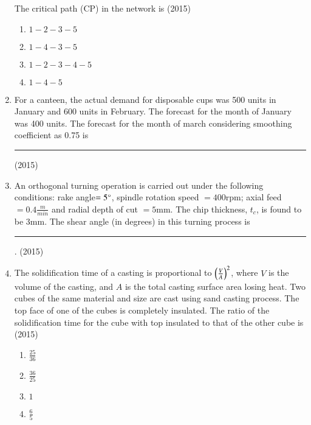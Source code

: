 \documentclass[journal]{IEEEtran}
\begin{document}
\begin{enumerate}
    The critical path (CP) in the network is
    \hfill{(2015)}
    
	\begin{multicols}{4}
		\begin{enumerate}
                \item $1-2-3-5$
                \item $1-4-3-5$
                \item $1-2-3-4-5$
                \item $1-4-5$
			\end{enumerate}
		\end{multicols}

    \item For a canteen, the actual demand for disposable cups was 500 units in January and 600 units in February. The forecast for the month of January was 400 units. The forecast for the month of march considering smoothing coefficient as 0.75 is \rule{1cm}{0.15mm}
    \hfill{(2015)}

    \item An orthogonal turning operation is carried out under the following conditions: rake angle$=5\degree$, spindle rotation speed $=400$rpm; axial feed $=0.4\frac{m}{min}$ and radial depth of cut $=5$mm. The chip thickness, $t_c$, is found to be 3mm. The shear angle (in degrees) in this turning process is \rule{1cm}{0.15mm}. 
    \hfill{(2015)}


    \item The solidification time of a casting is proportional to $\left(\frac{V}{A}\right)^2$, where $V$ is the volume of the casting, and $A$ is the total casting surface area losing heat. Two cubes of the same material and size are cast using sand casting process. The top face of one of the cubes is completely insulated. The ratio of the solidification time for the cube with top insulated to that of the other cube is
    \hfill{(2015)}

    \begin{multicols}{4}
        \begin{enumerate}
            \item $\frac{25}{36}$
            \item $\frac{36}{25}$
            \item $1$
            \item $\frac{6}{5}$
        \end{enumerate}
    \end{multicols}


\end{enumerate}
\end{document}
